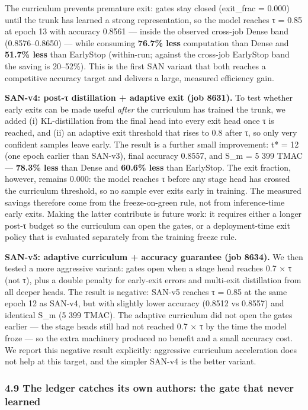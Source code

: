 \documentclass[
]{article}
\begin{document}
The curriculum prevents premature exit: gates stay closed (exit\_frac =
0.000) until the trunk has learned a strong representation, so the model
reaches τ = 0.85 at epoch 13 with accuracy 0.8561 --- inside the
observed cross-job Dense band (0.8576--0.8650) --- while consuming
\textbf{76.7\% less} computation than Dense and \textbf{51.7\% less}
than EarlyStop (within-run; against the cross-job EarlyStop band the
saving is 20--52\%). This is the first SAN variant that both reaches a
competitive accuracy target and delivers a large, measured efficiency
gain.

\textbf{SAN-v4: post-τ distillation + adaptive exit (job 8631).} To test
whether early exits can be made useful \emph{after} the curriculum has
trained the trunk, we added (i) KL-distillation from the final head into
every exit head once τ is reached, and (ii) an adaptive exit threshold
that rises to 0.8 after τ, so only very confident samples leave early.
The result is a further small improvement: t* = 12 (one epoch earlier
than SAN-v3), final accuracy 0.8557, and S\_m = 5 399 TMAC ---
\textbf{78.3\% less} than Dense and \textbf{60.6\% less} than EarlyStop.
The exit fraction, however, remains 0.000: the model reaches τ before
any stage head has crossed the curriculum threshold, so no sample ever
exits early in training. The measured savings therefore come from the
freeze-on-green rule, not from inference-time early exits. Making the
latter contribute is future work: it requires either a longer post-τ
budget so the curriculum can open the gates, or a deployment-time exit
policy that is evaluated separately from the training freeze rule.

\textbf{SAN-v5: adaptive curriculum + accuracy guarantee (job 8634).} We
then tested a more aggressive variant: gates open when a stage head
reaches 0.7 × τ (not τ), plus a double penalty for early-exit errors and
multi-exit distillation from all deeper heads. The result is negative:
SAN-v5 reaches τ = 0.85 at the same epoch 12 as SAN-v4, but with
slightly lower accuracy (0.8512 vs 0.8557) and identical S\_m (5 399
TMAC). The adaptive curriculum did not open the gates earlier --- the
stage heads still had not reached 0.7 × τ by the time the model froze
--- so the extra machinery produced no benefit and a small accuracy
cost. We report this negative result explicitly: aggressive curriculum
acceleration does not help at this target, and the simpler SAN-v4 is the
better variant.

\hypertarget{the-ledger-catches-its-own-authors-the-gate-that-never-learned}{%
\subsubsection{4.9 The ledger catches its own authors: the gate that
never
learned}\label{the-ledger-catches-its-own-authors-the-gate-that-never-learned}}
\end{document}
